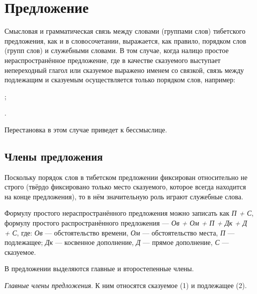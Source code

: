 \section{Предложение}

Смысловая и грамматическая связь между словами (группами слов) тибетского предложения, как и в словосочетании, выражается, как правило, порядком слов (групп слов) и служебными словами. В том случае, когда налицо простое нераспространённое предложение, где в качестве сказуемого выступает непереходный глагол или сказуемое выражено именем со связкой, связь между подлежащим и сказуемым осуществляется только порядком слов, например:
\begin{prfsample}
	\item {};
	\item {}.
\end{prfsample}
Перестановка в этом случае приведет к бессмыслице.

\subsection{Члены предложения}

Поскольку порядок слов в тибетском предложении фиксирован относительно не строго (твёрдо фиксировано только место сказуемого, которое всегда находится на конце предложения), то в нём значительную роль играют служебные слова.

Формулу простого нераспространённого предложения можно записать как \emph{П + С}, формулу простого распространённого предложения --- \emph{Ов + Ом + П + Дк + Д + С}, где:
\emph{Ов} --- обстоятельство времени,
\emph{Ом} --- обстоятельство места,
\emph{П} --- подлежащее;
\emph{Дк} --- косвенное дополнение,
\emph{Д} --- прямое дополнение,
\emph{С} --- сказуемое.

В предложении выделяются главные и второстепенные члены.

\emph{Главные члены предложения}. К ним относятся сказуемое (1) и подлежащее (2).

